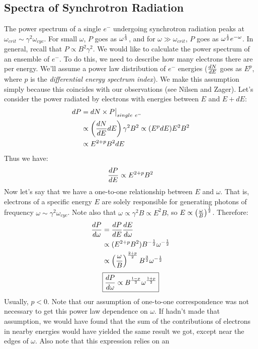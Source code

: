 \documentclass[11pt]{article}
\def\hf{{1 \over 2}}
\def\eval#1{\big|_{#1}}
\begin{document}
\subsection*{ Spectra of Synchrotron Radiation}

The power spectrum of a single $e^-$ undergoing synchrotron radiation peaks at 
$\omega_{crit}\sim\gamma^2\omega_{cyc}$.  For small $\omega$, $P$ goes as
$\omega^{1\over3}$, and for $\omega\gg\omega_{crit}$, $P$ goes as
$\omega^\hf e^{-\omega}$.  In general, recall that $P\propto B^2\gamma^2$.
We would like to calculate the power spectrum of an ensemble of $e^-$.  To do
this, we need to describe how many electrons there are per energy.  We'll
assume a power law distribution of $e^-$ energies (${dN\over dE}$ goes as
$E^p$, where $p$ is the {\it differential energy spectrum index}).  We make this
assumption simply because this coincides with our observations (see Nilsen and
Zager).  Let's consider the power radiated by electrons with energies between
$E$ and $E+dE$:
$$\begin{aligned}dP&=dN\times P\eval{single\ e^-}\\ 
&\propto\left({dN\over dE}dE\right)\gamma^2B^2\propto(E^pdE)E^2B^2\\ 
&\propto E^{2+p}B^2dE\\ \end{aligned}$$
Thus we have:
$${dP\over dE}\propto E^{2+p}B^2$$
Now let's say that we have a one-to-one relationship between $E$ and $\omega$.
That is, electrons of a specific energy $E$ are solely responsible for
generating photons of frequency $\omega\sim\gamma^2\omega_{cyc}$.  Note also
that $\omega\propto\gamma^2B\propto E^2B$, so $E\propto\left({\omega\over B}
\right)^\hf$.  Therefore:
$$\begin{aligned}{dP\over d\omega}&={dP\over dE}{dE\over d\omega}\\ 
&\propto(E^{2+p}B^2)B^{-\hf}\omega^{-\hf}\\ 
&\propto\left({\omega\over B}\right)^{2+p\over2}B^{3\over2}\omega^{-\hf}\\ \end{aligned}$$
$$\boxed{{dP\over d\omega}\propto B^{1-p\over2}\omega^{1+p\over2}}$$
Usually, $p<0$.  Note that our assumption of one-to-one correspondence was
not necessary to get this power law dependence on $\omega$.  If hadn't made
that assumption, we would have found that the sum of the contributions of
electrons in nearby energies would have yielded the same result we got, except
near the edges of $\omega$.  Also note that this expression relies on an
\end{document}
